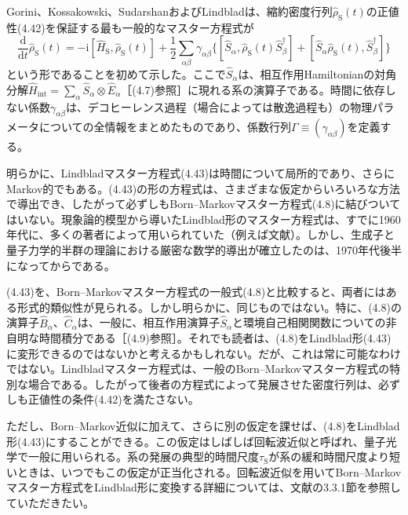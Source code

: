 Gorini、Kossakowski、Sudarshan\cite{ref176}およびLindblad\cite{ref177}は、縮約密度行列$\hat\rho_{\mathrm S}(t)$の正値性(4.42)を保証する最も一般的なマスター方程式が
\begin{equation}
\frac{\mathrm d}{\mathrm dt}\hat\rho_{\mathrm S}(t)=-\mathrm i[\hat H_{\mathrm S},\hat\rho_{\mathrm S}(t)]
+\frac12\sum_{\alpha\beta}\gamma_{\alpha\beta}\big\{[\hat S_\alpha,\hat\rho_{\mathrm S}(t)\hat S_\beta^{\dagger}]
+[\hat S_\alpha\hat\rho_{\mathrm S}(t),\hat S_\beta^{\dagger}]\big\}
\tag{4.43}
\end{equation}
という形であることを初めて示した。ここで$\hat S_\alpha$は、相互作用Hamiltonianの対角分解$\hat H_{\mathrm{int}}=\sum_\alpha\hat S_\alpha\otimes\hat E_\alpha$［(4.7)参照］に現れる系の演算子である。時間に依存しない係数$\gamma_{\alpha\beta}$は、デコヒーレンス過程（場合によっては散逸過程も）の物理パラメータについての全情報をまとめたものであり、係数行列$\Gamma\equiv(\gamma_{\alpha\beta})$を定義する。

明らかに、Lindbladマスター方程式(4.43)は時間について局所的であり、さらにMarkov的でもある。(4.43)の形の方程式は、さまざまな仮定からいろいろな方法で導出でき、したがって必ずしもBorn--Markovマスター方程式(4.8)に結びついてはいない。現象論的模型から導いたLindblad形のマスター方程式は、すでに1960年代に、多くの著者によって用いられていた（例えば文献\cite{ref178}）。しかし、生成子と量子力学的半群の理論における厳密な数学的導出が確立したのは、1970年代後半になってからである\cite{ref176,ref177,ref179,ref180,ref181}。

(4.43)を、Born--Markovマスター方程式の一般式(4.8)と比較すると、両者にはある形式的類似性が見られる。しかし明らかに、同じものではない。特に、(4.8)の演算子$\hat B_\alpha$、$\hat C_\alpha$は、一般に、相互作用演算子$\hat S_\alpha$と環境自己相関関数についての非自明な時間積分である［(4.9)参照］。それでも読者は、(4.8)をLindblad形(4.43)に変形できるのではないかと考えるかもしれない。だが、これは常に可能なわけではない。Lindbladマスター方程式は、一般のBorn--Markovマスター方程式の特別な場合である。したがって後者の方程式によって発展させた密度行列は、必ずしも正値性の条件(4.42)を満たさない\cite{ref182}。

ただし、Born--Markov近似に加えて、さらに別の仮定を課せば、(4.8)をLindblad形(4.43)にすることができる。この仮定はしばしば回転波近似と呼ばれ、量子光学で一般に用いられる。系の発展の典型的時間尺度$\tau_{\mathrm S}$が系の緩和時間尺度より短いときは、いつでもこの仮定が正当化される。回転波近似を用いてBorn--Markovマスター方程式をLindblad形に変換する詳細については、文献\cite{ref018}の3.3.1節を参照していただきたい。


